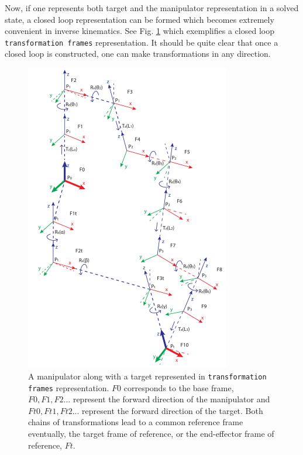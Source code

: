 {{        Now, if one represents both target and the manipulator representation in a solved state, a closed loop representation can be formed which becomes extremely convenient in inverse kinematics. See Fig. \ref{FigCompleteRep} which exemplifies a closed loop \texttt{transformation frames} representation. It should be quite clear that once a closed loop is constructed, one can make transformations in any direction.

        \begin{figure}
          \centering
          \includegraphics[width=0.8\textwidth]{../Images/CompleteRep.pdf}
          \caption{A manipulator along with a target represented in \texttt{transformation frames} representation. $F0$ corresponds to the base frame, $F0, F1, F2 ...$ represent the forward direction of the manipulator and $Ft0, Ft1, Ft2 ...$ represent the forward direction of the target. Both chains of transformations lead to a common reference frame eventually, the target frame of reference, or the end-effector frame of reference, $Ft$.
          } \label{FigCompleteRep}
        \end{figure}

}}
